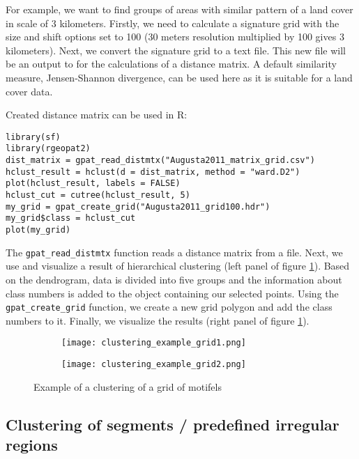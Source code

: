 For example, we want to find groups of areas with similar pattern of a land cover in scale of 3 kilometers.
Firstly, we need to calculate a signature grid with the size and shift options set to 100 (30 meters resolution multiplied by 100 gives 3 kilometers).
Next, we convert the signature grid to a text file.
This new file will be an output to for the calculations of a distance matrix.
A default similarity measure, Jensen-Shannon divergence, can be used here as it is suitable for a land cover data.

Created distance matrix can be used in R:

\begin{minipage}{\linewidth}
\begin{lstlisting}
library(sf)
library(rgeopat2)
dist_matrix = gpat_read_distmtx("Augusta2011_matrix_grid.csv")
hclust_result = hclust(d = dist_matrix, method = "ward.D2")
plot(hclust_result, labels = FALSE)
hclust_cut = cutree(hclust_result, 5)
my_grid = gpat_create_grid("Augusta2011_grid100.hdr")
my_grid$class = hclust_cut
plot(my_grid)
\end{lstlisting}
\end{minipage}

The {\tt gpat\_read\_distmtx} function reads a distance matrix from a file. 
Next, we use and visualize a result of hierarchical clustering (left panel of figure \ref{FIG:CLUSTER_GRID2}).
Based on the dendrogram, data is divided into five groups and the information about class numbers is added to the object containing our selected points.
Using the {\tt gpat\_create\_grid} function, we create a new grid polygon and add the class numbers to it.
Finally, we visualize the results (right panel of figure \ref{FIG:CLUSTER_GRID2}).

\begin{figure}[H]
  \begin{subfigure}[b]{0.5\textwidth}
    \texttt{[image: clustering\_example\_grid1.png]}
  \end{subfigure}
  \begin{subfigure}[b]{0.5\textwidth}
    \texttt{[image: clustering\_example\_grid2.png]}
  \end{subfigure}
  \caption{Example of a clustering of a grid of motifels}
  \label{FIG:CLUSTER_GRID2}
\end{figure}

\FloatBarrier

\subsection{Clustering of segments / predefined irregular regions}

